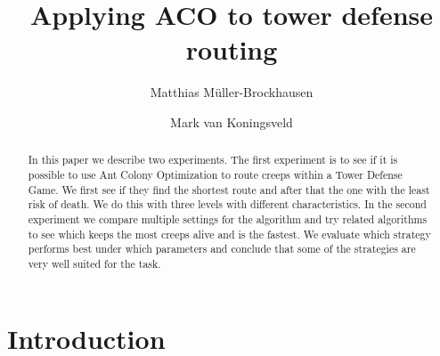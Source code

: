 \documentclass[runningheads,a4paper]{llncs}
\begin{document}
\mainmatter  %

\title{Applying ACO to tower defense routing}


%
%
\author{Matthias Müller-Brockhausen \and Mark van Koningsveld}
%


%
%

\maketitle


\begin{abstract}
In this paper we describe two experiments. The first experiment is to see if it is possible to use Ant Colony Optimization to route creeps within a Tower Defense Game. We first see if they find the shortest route and after that the one with the least risk of death. We do this with three levels with different characteristics. In the second experiment we compare multiple settings for the algorithm and try related algorithms to see which keeps the most creeps alive and is the fastest. We evaluate which strategy performs best under which parameters and conclude that some of the strategies are very well suited for the task.
\end{abstract}




\section{Introduction}
\label{sec:introduction}


\end{document}
